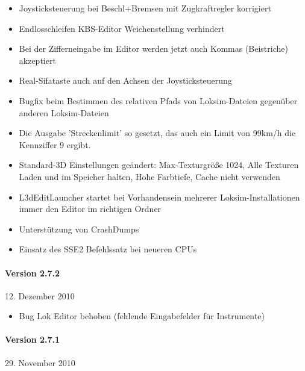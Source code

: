 \begin{itemize}
\item
  Joysticksteuerung bei Beschl+Bremsen mit Zugkraftregler korrigiert
\item
  Endlosschleifen KBS-Editor Weichenstellung verhindert
\item
  Bei der Zifferneingabe im Editor werden jetzt auch Kommas (Beistriche)
  akzeptiert
\item
  Real-Sifataste auch auf den Achsen der Joysticksteuerung
\item
  Bugfix beim Bestimmen des relativen Pfads von Loksim-Dateien gegenüber
  anderen Loksim-Dateien
\item
  Die Ausgabe 'Streckenlimit' so gesetzt, das auch ein Limit von 99km/h
  die Kennziffer 9 ergibt.
\item
  Standard-3D Einstellungen geändert: Max-Texturgröße 1024, Alle
  Texturen Laden und im Speicher halten, Hohe Farbtiefe, Cache nicht
  verwenden
\item
  L3dEditLauncher startet bei Vorhandensein mehrerer
  Loksim-Installationen immer den Editor im richtigen Ordner
\item
  Unterstützung von CrashDumps
\item
  Einsatz des SSE2 Befehlssatz bei neueren CPUs
\end{itemize}

\paragraph{Version 2.7.2}

12. Dezember 2010

\begin{itemize}
\itemsep1pt\parskip0pt
\item
  Bug Lok Editor behoben (fehlende Eingabefelder für Instrumente)
\end{itemize}

\paragraph{Version 2.7.1}

29. November 2010

